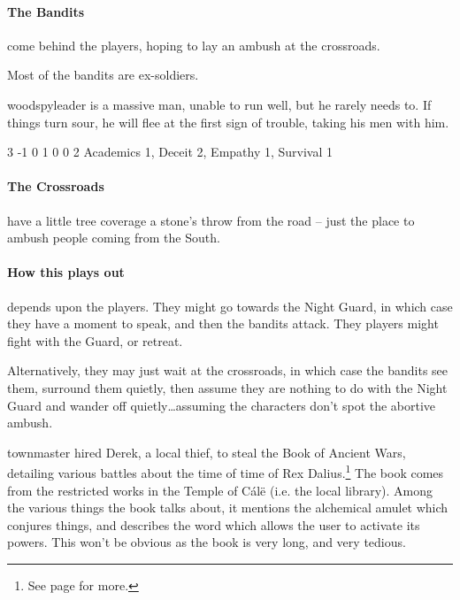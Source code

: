 \begin{multicols}{2}

\humansoldier

\paragraph{The Bandits} come behind the players, hoping to lay an ambush at the crossroads.


Most of the bandits are ex-soldiers.

\humansoldier

\label{woodspyleader}

\Gls{woodspyleader} is a massive man, unable to run well, but he rarely needs to.
If things turn sour, he will flee at the first sign of trouble, taking his men with him.

{3}%
{-1}%
{{0}%
{1}%
{0}}%
{0}%
{2}%
{Academics 1, Deceit 2, Empathy 1, Survival 1}%
{\greataxe}%
{}


\paragraph{The Crossroads} have a little tree coverage a stone's throw from the road -- just the place to ambush people coming from the South.

\paragraph{How this plays out} depends upon the players.
They might go towards the Night Guard, in which case they have a moment to speak, and then the bandits attack.
They players might fight with the Guard, or retreat.

Alternatively, they may just wait at the crossroads, in which case the bandits see them, surround them quietly, then assume they are nothing to do with the Night Guard and wander off quietly\ldots assuming the characters don't spot the abortive ambush.

\vfill\null


\Gls{townmaster} hired Derek, a local thief, to steal the Book of Ancient Wars, detailing various battles about the time of time of Rex Dalius.\footnote{See page \pageref{h_dalius} for more.}
The book comes from the restricted works in the Temple of C\'{a}l\"{e} (i.e. the local library).
Among the various things the book talks about, it mentions the alchemical amulet which conjures things, and describes the word which allows the user to activate its powers.
This won't be obvious as the book is very long, and very tedious.


\end{multicols}

